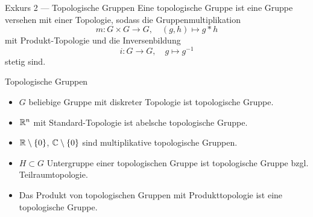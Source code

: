 \begin{bla}{Exkurs 2 --- Topologische Gruppen}
  Eine topologische Gruppe ist eine Gruppe versehen mit einer Topologie, sodass die Gruppenmultiplikation
  \begin{equation*}
    m: G \times G \to G, \quad (g,h) \mapsto g*h
  \end{equation*}
  mit Produkt-Topologie und die Inversenbildung
  \begin{equation*}
    i: G \to G, \quad g \mapsto g^{-1 }
  \end{equation*}
  stetig sind.
\end{bla}

\begin{example}{Topologische Gruppen}
  \begin{itemize}
    \item $ G $ beliebige Gruppe mit diskreter Topologie ist topologische Gruppe.
    \item $ \mathbb{R}^n $ mit Standard-Topologie ist abelsche topologische Gruppe.
    \item $ \mathbb{R} \setminus \{ 0 \} $, $ \mathbb{C} \setminus \{ 0 \} $ sind multiplikative topologische Gruppen.
    \item $ H \subset G $ Untergruppe einer topologischen Gruppe ist topologische Gruppe bzgl. Teilraumtopologie.
    \item Das Produkt von topologischen Gruppen mit Produkttopologie ist eine topologische Gruppe.
  \end{itemize}
\end{example}
